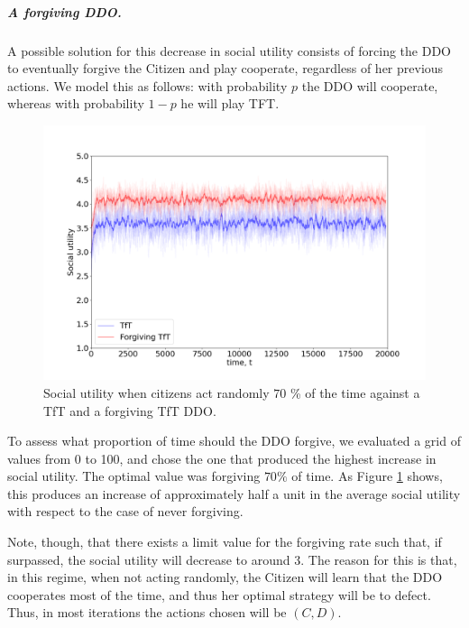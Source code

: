 
\subparagraph{A forgiving DDO.}
A possible solution for this decrease in social utility consists of forcing the DDO to eventually forgive the Citizen and play cooperate, regardless of
her previous actions. We model this as follows: with probability $p$ the DDO will cooperate, whereas with probability $1-p$ he will play TFT. 
%
%

\begin{figure}[h!]
\centering
\includegraphics[width=0.6\linewidth]{img/forgiving_tft.png}%
\caption{Social utility when citizens act randomly $70$ \% of the time against a TfT and a forgiving TfT DDO.}\label{fig:25}
\end{figure}

To assess what proportion of time should the DDO forgive, we evaluated a grid of values from 0 to 100, and chose the one that produced the highest increase in social utility. The optimal value was forgiving $70 \%$ of time.
As Figure \ref{fig:25} shows, this produces an increase of approximately half a unit in the average social utility with respect to the case of never forgiving.

Note, though, that there exists a limit value for the forgiving rate such that, if surpassed, the social utility will decrease to around 3. The reason for this is that, in this regime, when not acting randomly, the Citizen will learn that the DDO cooperates most of the time, and thus her  optimal strategy will be to defect. Thus, in most iterations the actions chosen will be $(C, D)$. %

